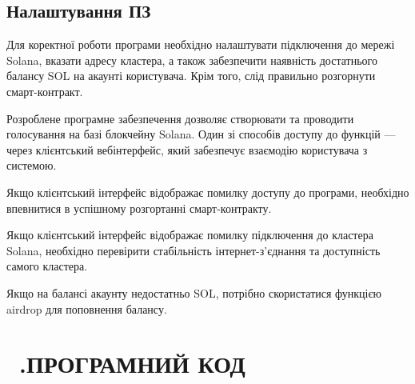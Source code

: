 \documentclass[14pt]{extreport}
\newcommand{\tocnumchap}[1]{
  \refstepcounter{chapter}
  \chapter*{\MakeUppercase{\chaptername}~\thechapter.\hspace{1em}\MakeUppercase{#1}}
  \addcontentsline{toc}{chapter}{\vspace{-7pt}\MakeUppercase{\chaptername}~\thechapter.\hspace{1em}\MakeUppercase{#1}}
}
\newcommand{\nocontentsline}[3]{}
\newcommand{\tocless}[2]{\bgroup\let\addcontentsline=\nocontentsline#1{#2}\egroup}
\begin{document}
  \tocless\section{Налаштування ПЗ}
  
  Для коректної роботи програми необхідно налаштувати підключення до мережі Solana, вказати адресу кластера, а також забезпечити наявність достатнього балансу SOL на акаунті користувача. Крім того, слід правильно розгорнути смарт-контракт.
  
  \tocless\section{Базові функції ПЗ}
  
  Розроблене програмне забезпечення дозволяє створювати та проводити голосування на базі блокчейну Solana. Один зі способів доступу до функцій — через клієнтський вебінтерфейс, який забезпечує взаємодію користувача з системою.
  
  \tocless\section{Аналіз помилок}
  
  Якщо клієнтський інтерфейс відображає помилку доступу до програми, необхідно впевнитися в успішному розгортанні смарт-контракту.
  
  Якщо клієнтський інтерфейс відображає помилку підключення до кластера Solana, необхідно перевірити стабільність інтернет-з’єднання та доступність самого кластера.
  
  Якщо на балансі акаунту недостатньо SOL, потрібно скористатися функцією airdrop для поповнення балансу.
  
  \tocnumchap{Програмний код}
  \label{app:code}
 
  \tocless\section{Лістинг файлу create\_poll.rs}
 
  \begin{multicols}{2}
  {
  
  }
  \end{multicols}
  
  \tocless\section{Лістинг файлу edit\_poll.rs}
  
\end{document}
